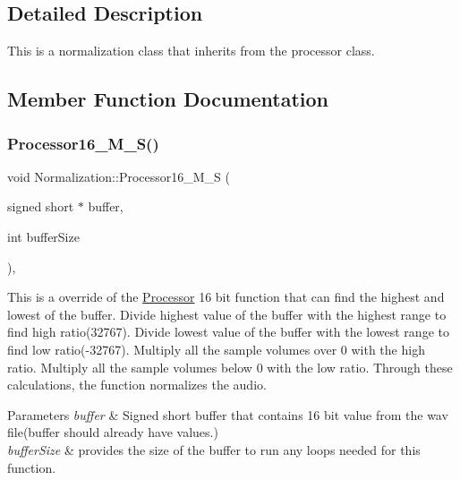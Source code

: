 \subsection{Detailed Description}
This is a normalization class that inherits from the processor class. 

\subsection{Member Function Documentation}
\mbox{\label{classNormalization_a9e20f1881043dbce47e11ebdca6689ca}} 
\subsubsection{\texorpdfstring{Processor16\+\_\+\+M\+\_\+\+S()}{Processor16\_M\_S()}}
{\footnotesize\ttfamily void Normalization\+::\+Processor16\+\_\+\+M\+\_\+S (\begin{DoxyParamCaption}\item[{signed short $\ast$}]{buffer,  }\item[{int}]{buffer\+Size }\end{DoxyParamCaption})\hspace{0.3cm}{\ttfamily [override]}, {\ttfamily [virtual]}}



This is a override of the \hyperlink{classProcessor}{Processor} 16 bit function that can find the highest and lowest of the buffer. Divide highest value of the buffer with the highest range to find high ratio(32767). Divide lowest value of the buffer with the lowest range to find low ratio(-\/32767). Multiply all the sample volumes over 0 with the high ratio. Multiply all the sample volumes below 0 with the low ratio. Through these calculations, the function normalizes the audio. 


\begin{DoxyParams}{Parameters}
{\em buffer} & Signed short buffer that contains 16 bit value from the wav file(buffer should already have values.) \\
\hline
{\em buffer\+Size} & provides the size of the buffer to run any loops needed for this function. \\
\hline
\end{DoxyParams}


